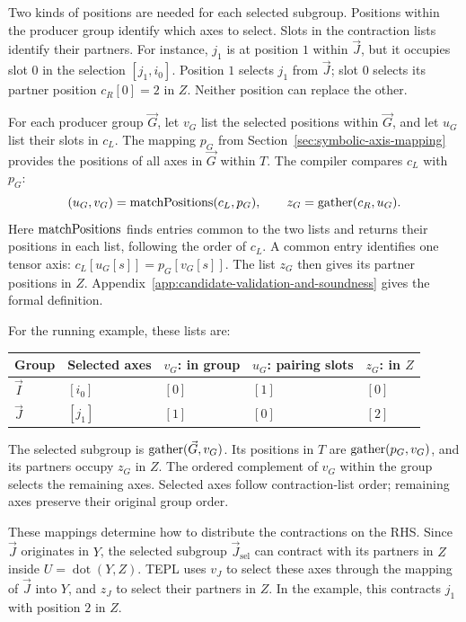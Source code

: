 Two kinds of positions are needed for each selected subgroup.
Positions within the producer group identify which axes to select.
Slots in the contraction lists identify their partners.
For instance, $j_1$ is at position $1$ within $\vec J$, but it occupies
slot $0$ in the selection $[j_1,i_0]$.
Position $1$ selects $j_1$ from $\vec J$; slot $0$ selects its partner
position $c_R[0]=2$ in $Z$.
Neither position can replace the other.

For each producer group $\vec G$, let $v_G$ list the selected positions
within $\vec G$, and let $u_G$ list their slots in $c_L$.
The mapping $p_G$ from Section~\ref{sec:symbolic-axis-mapping}
provides the positions of all axes in $\vec G$ within $T$.
The compiler compares $c_L$ with $p_G$:
\begin{equation}
 (u_G,v_G)=\operatorname{matchPositions}(c_L,p_G),\qquad
 z_G=\operatorname{gather}(c_R,u_G).
 \label{eq:symbolic-partition-selectors}
\end{equation}
Here $\operatorname{matchPositions}$ finds entries common to the two lists and returns their
positions in each list, following the order of $c_L$.
A common entry identifies one tensor axis:
$c_L[u_G[s]]=p_G[v_G[s]]$.
The list $z_G$ then gives its partner positions in $Z$.
Appendix~\ref{app:candidate-validation-and-soundness} gives the formal
definition.

For the running example, these lists are:
\begin{center}
\small
\begin{tabular}{@{}lllll@{}}\toprule
Group & Selected axes & $v_G$: in group & $u_G$: pairing slots
      & $z_G$: in $Z$\\\midrule
$\vec I$ & $[i_0]$ & $[0]$ & $[1]$ & $[0]$\\
$\vec J$ & $[j_1]$ & $[1]$ & $[0]$ & $[2]$\\\bottomrule
\end{tabular}
\end{center}
The selected subgroup is $\operatorname{gather}(\vec G,v_G)$.
Its positions in $T$ are $\operatorname{gather}(p_G,v_G)$, and its partners occupy
$z_G$ in $Z$. The ordered complement of $v_G$ within the group
selects the remaining axes. Selected axes follow contraction-list
order; remaining axes preserve their original group order.

These mappings determine how to distribute the contractions on the RHS.
Since $\vec J$ originates in $Y$, the selected subgroup
$\vec J_{\mathrm{sel}}$ can contract with its partners in $Z$ inside
$U=\operatorname{dot}(Y,Z)$.
TEPL uses $v_J$ to select these axes through the mapping of $\vec J$
into $Y$, and $z_J$ to select their partners in $Z$.
In the example, this contracts $j_1$ with position $2$ in $Z$.

